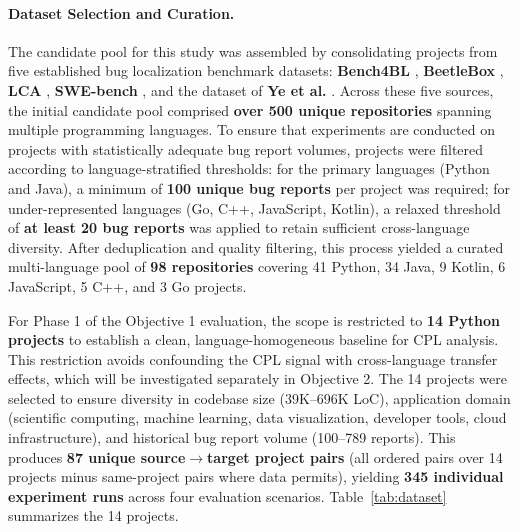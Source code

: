 \documentclass[12pt,table,xcdraw]{article}
\begin{document}
\paragraph{Dataset Selection and Curation.}
The candidate pool for this study was assembled by consolidating projects from five established bug localization benchmark datasets: \textbf{Bench4BL} \cite{lee2018bench4bl}, \textbf{BeetleBox} \cite{chakraborty2025blaze}, \textbf{LCA} \cite{ciborowska2022fast}, \textbf{SWE-bench} \cite{jimenez2023swe}, and the dataset of \textbf{Ye et al.} \cite{ye2014learning}. Across these five sources, the initial candidate pool comprised \textbf{over 500 unique repositories} spanning multiple programming languages. To ensure that experiments are conducted on projects with statistically adequate bug report volumes, projects were filtered according to language-stratified thresholds: for the primary languages (Python and Java), a minimum of \textbf{100 unique bug reports} per project was required; for under-represented languages (Go, C++, JavaScript, Kotlin), a relaxed threshold of \textbf{at least 20 bug reports} was applied to retain sufficient cross-language diversity. After deduplication and quality filtering, this process yielded a curated multi-language pool of \textbf{98 repositories} covering 41 Python, 34 Java, 9 Kotlin, 6 JavaScript, 5 C++, and 3 Go projects.

For Phase 1 of the Objective 1 evaluation, the scope is restricted to \textbf{14 Python projects} to establish a clean, language-homogeneous baseline for CPL analysis. This restriction avoids confounding the CPL signal with cross-language transfer effects, which will be investigated separately in Objective 2. The 14 projects were selected to ensure diversity in codebase size (39K--696K LoC), application domain (scientific computing, machine learning, data visualization, developer tools, cloud infrastructure), and historical bug report volume (100--789 reports). This produces \textbf{87 unique source$\rightarrow$target project pairs} (all ordered pairs over 14 projects minus same-project pairs where data permits), yielding \textbf{345 individual experiment runs} across four evaluation scenarios. Table~\ref{tab:dataset} summarizes the 14 projects.
\end{document}
